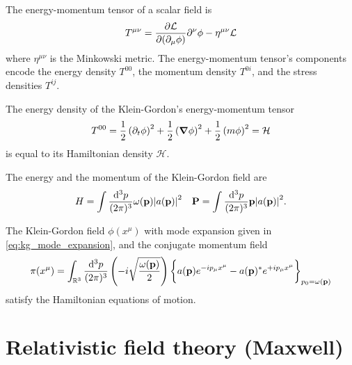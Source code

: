 \begin{definition}
	The energy-momentum tensor of a scalar field is
	\begin{equation}
		T^{\mu\nu}
		=
		\pdv{\mathcal{L}}{(\partial_\mu\phi)}\partial^\nu\phi
		-
		\eta^{\mu\nu}\mathcal{L}
		\label{eq:energy_momentum_tensor}
	\end{equation}
	where $\eta^{\mu\nu}$ is the Minkowski metric.
	The energy-momentum tensor's components encode the energy density $T^{00}$, the momentum density $T^{0i}$, and the stress densities $T^{ij}$.
\end{definition}
\begin{lemma}\label{thm:kg_energy_density}
	The energy density of the Klein-Gordon's energy-momentum tensor
	\begin{equation}
		T^{00}
		=
		\frac{1}{2}
		\left(\partial_t\phi\right)^2
		+
		\frac{1}{2}
		\left(\grad\phi\right)^2
		+
		\frac{1}{2}
		\left(m\phi\right)^2
		=
		\mathcal{H}
		\label{thm:kg_hamiltonian}
	\end{equation}
	is equal to its Hamiltonian density $\mathcal{H}$.
\end{lemma}
\begin{lemma}\label{thm:kg_energy_momentum}
	The energy and the momentum of the Klein-Gordon field are
	\begin{align}
		H
		=
		\int\frac{\dd[3]{p}}{(2\pi)^3}
		\omega(\vb{p})\abs{a(\vb{p})}^2
		&&
		\vb{P}
		=
		\int\frac{\dd[3]{p}}{(2\pi)^3}
		\vb{p}\abs{a(\vb{p})}^2
		\label{eq:kg_energy_momentum}
		.
	\end{align}
\end{lemma}
\begin{lemma}\label{thm:kg_conjugate_momentum}
	The Klein-Gordon field $\phi(x^\mu)$ with mode expansion given in \cref{eq:kg_mode_expansion}, and the conjugate momentum field
	\begin{equation}
		\pi(x^\mu)
		=
		\int_{\mathbb{R}^3}\frac{\dd[3]{p}}{(2\pi)^3}
		\left(
			-i
			\sqrt{\frac{\omega(\vb{p})}{2}}
		\right)
		\biggl\{
			a(\vb{p})
			e^{-ip_\mu x^\mu}
			-
			a(\vb{p})^*
			e^{+ip_\mu x^\mu}
		\biggr\}_{p_0=\omega(\vb{p})}
		\label{eq:kg_conjugate_momentum}
	\end{equation}
	satisfy the Hamiltonian equations of motion.
\end{lemma}

\section{Relativistic field theory (Maxwell)}

